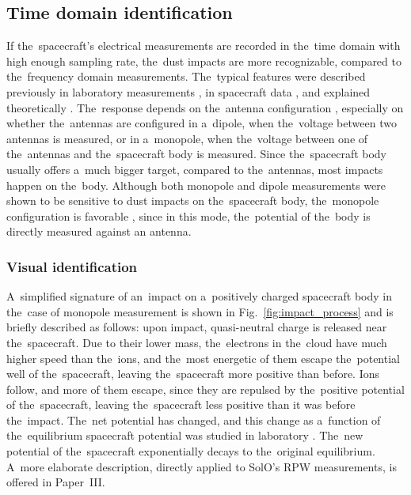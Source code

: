 \subsection{Time domain identification}

If the~spacecraft's electrical measurements are recorded in the~time domain with high enough sampling rate, the~dust impacts are more recognizable, compared to the~frequency domain measurements. The~typical features were described previously in laboratory measurements \citep{auer1968,nouzak2018laboratory,shen2021laboratory,shen2023variability}, in spacecraft data \citep{zaslavsky2012interplanetary,kellogg2016dust,vaverka2021ion}, and explained theoretically \citep{zaslavsky2015floating,meyer2017frequency,shen2021electrostatic,babic2022analytical}. The~response depends on the~antenna configuration \citep{shen2023variability,vaverka2021ion}, especially on whether the~antennas are configured in a~dipole, when the~voltage between two antennas is measured, or in a~monopole, when the~voltage between one of the~antennas and the~spacecraft body is measured. Since the~spacecraft body usually offers a~much bigger target, compared to the~antennas, most impacts happen on the~body. Although both monopole and dipole measurements were shown to be sensitive to dust impacts on the~spacecraft body, the~monopole configuration is favorable \citep{meyer2014importance,mann2019dust}, since in this mode, the~potential of the~body is directly measured against an antenna. 

\subsubsection{Visual identification}

A~simplified signature of an~impact on a~positively charged spacecraft body in the~case of monopole measurement is shown in Fig.~\ref{fig:impact_process} and is briefly described as follows: upon impact, quasi-neutral charge is released near the~spacecraft. Due to their lower mass, the~electrons in the~cloud have much higher speed than the~ions, and the~most energetic of them escape the~potential well of the~spacecraft, leaving the~spacecraft more positive than before. Ions follow, and more of them escape, since they are repulsed by the~positive potential of the~spacecraft, leaving the~spacecraft less positive than it was before the~impact. The~net potential has changed, and this change as a~function of the~equilibrium spacecraft potential was studied in laboratory \citep{collette2016characteristic,kovcivsvcak2020effective}. The~new potential of the~spacecraft exponentially decays to the~original equilibrium. A~more elaborate description, directly applied to SolO's RPW measurements, is offered in Paper~III.

